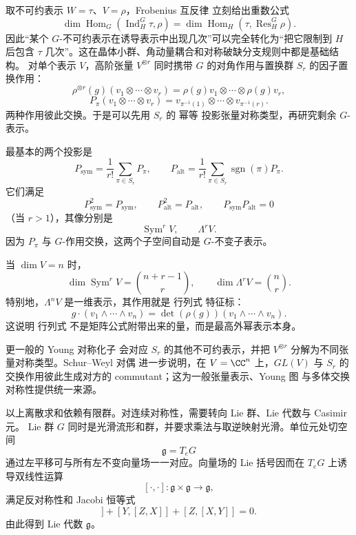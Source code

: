 取不可约表示 $W=\tau$、$V=\rho$，Frobenius 互反律 立刻给出重数公式
\[
\dim\operatorname{Hom}_G(\operatorname{Ind}_H^G\tau,\rho)
=
\dim\operatorname{Hom}_H(\tau,\operatorname{Res}_H^G\rho).
\]
因此“某个 $G$-不可约表示在诱导表示中出现几次”可以完全转化为“把它限制到 $H$ 后包含 $\tau$ 几次”。这在晶体小群、角动量耦合和对称破缺分支规则中都是基础结构。
对单个表示 $V$，高阶张量 $V^{\otimes r}$ 同时携带 $G$ 的对角作用与置换群 $S_r$ 的因子置换作用：
\[
\rho^{\otimes r}(g)
(v_1\otimes\cdots\otimes v_r)
=
\rho(g)v_1\otimes\cdots\otimes\rho(g)v_r,
\]
\[
P_\pi(v_1\otimes\cdots\otimes v_r)
=
v_{\pi^{-1}(1)}\otimes\cdots\otimes v_{\pi^{-1}(r)}.
\]
两种作用彼此交换。于是可以先用 $S_r$ 的 幂等 投影张量对称类型，再研究剩余 $G$-表示。

最基本的两个投影是
\begin{equation*}P_{\mathrm{sym}}
=
\frac1{r!}\sum_{\pi\in S_r}P_\pi,
\qquad
P_{\mathrm{alt}}
=
\frac1{r!}\sum_{\pi\in S_r}
\operatorname{sgn}(\pi)P_\pi.\end{equation*}
它们满足
\[
P_{\mathrm{sym}}^2=P_{\mathrm{sym}},
\qquad
P_{\mathrm{alt}}^2=P_{\mathrm{alt}},
\qquad
P_{\mathrm{sym}}P_{\mathrm{alt}}=0
\]
（当 $r>1$），其像分别是
\[
\operatorname{Sym}^rV,
\qquad
\Lambda^rV.
\]
因为 $P_\pi$ 与 $G$-作用交换，这两个子空间自动是 $G$-不变子表示。

当 $\dim V=n$ 时，
\[
\dim\operatorname{Sym}^rV
=\binom{n+r-1}{r},
\qquad
\dim\Lambda^rV
=\binom nr.
\]
特别地，$\Lambda^nV$ 是一维表示，其作用就是 行列式 特征标：
\[
g\cdot(v_1\wedge\cdots\wedge v_n)
=
\det(\rho(g))
(v_1\wedge\cdots\wedge v_n).
\]
这说明 行列式 不是矩阵公式附带出来的量，而是最高外幂表示本身。

更一般的 Young 对称化子 会对应 $S_r$ 的其他不可约表示，并把 $V^{\otimes r}$ 分解为不同张量对称类型。Schur--Weyl 对偶 进一步说明，在 $V=\CC^n$ 上，$GL(V)$ 与 $S_r$ 的交换作用彼此生成对方的 commutant；这为一般张量表示、Young 图 与多体交换对称性提供统一来源。

以上离散求和依赖有限群。对连续对称性，需要转向 Lie 群、Lie 代数与 Casimir 元。
\label{sec:lie-groups-algebras}
Lie 群 $G$ 同时是光滑流形和群，并要求乘法与取逆映射光滑。单位元处切空间
\[
\mathfrak g=T_eG
\]
通过左平移可与所有左不变向量场一一对应。向量场的 Lie 括号因而在 $T_eG$ 上诱导双线性运算
\[
[\cdot,\cdot]:\mathfrak g\times\mathfrak g\to\mathfrak g,
\]
满足反对称性和 Jacobi 恒等式
\begin{equation*}[X,[Y,Z]]+[Y,[Z,X]]+[Z,[X,Y]]=0.\end{equation*}
由此得到 Lie 代数 $\mathfrak g$。

